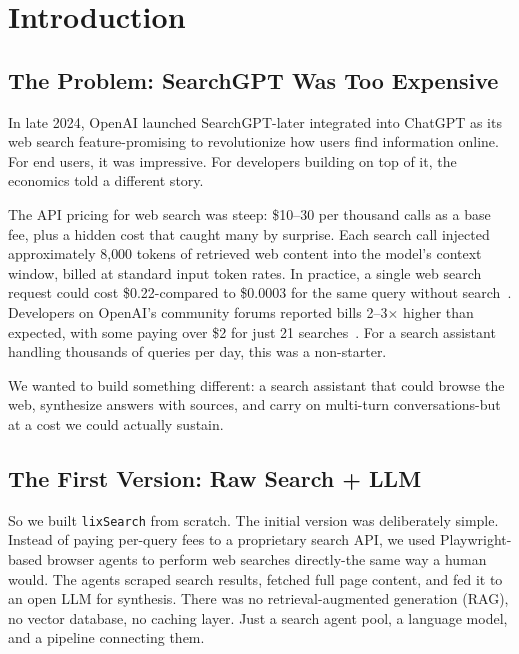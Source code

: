 \documentclass[conference]{IEEEtran}
\begin{document}
\section{Introduction}

\subsection{The Problem: SearchGPT Was Too Expensive}

In late 2024, OpenAI launched SearchGPT-later integrated into ChatGPT as its web search feature-promising to revolutionize how users find information online. For end users, it was impressive. For developers building on top of it, the economics told a different story.

The API pricing for web search was steep: \$10--30 per thousand calls as a base fee, plus a hidden cost that caught many by surprise. Each search call injected approximately 8{,}000 tokens of retrieved web content into the model's context window, billed at standard input token rates. In practice, a single web search request could cost \$0.22-compared to \$0.0003 for the same query without search~\cite{openai_search_pricing}. Developers on OpenAI's community forums reported bills 2--3$\times$ higher than expected, with some paying over \$2 for just 21 searches~\cite{openai_search_billing}. For a search assistant handling thousands of queries per day, this was a non-starter.

We wanted to build something different: a search assistant that could browse the web, synthesize answers with sources, and carry on multi-turn conversations-but at a cost we could actually sustain.

\subsection{The First Version: Raw Search + LLM}

So we built \texttt{lixSearch} from scratch. The initial version was deliberately simple. Instead of paying per-query fees to a proprietary search API, we used Playwright-based browser agents to perform web searches directly-the same way a human would. The agents scraped search results, fetched full page content, and fed it to an open LLM for synthesis. There was no retrieval-augmented generation (RAG), no vector database, no caching layer. Just a search agent pool, a language model, and a pipeline connecting them.
\end{document}
